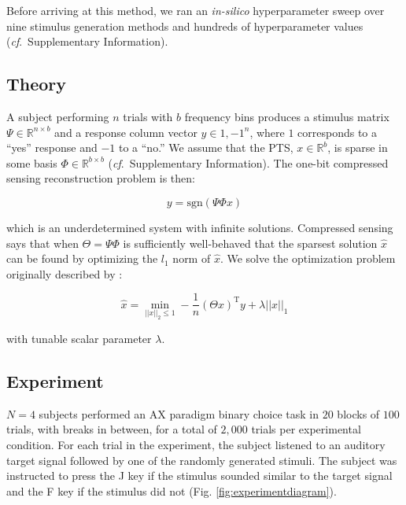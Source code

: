 \documentclass[journal]{IEEEtran}
\newcommand{\cf}{\textit{cf}.\ }
\begin{document}
Before arriving at this method, we ran an \textit{in-silico} hyperparameter sweep over
nine stimulus generation methods and hundreds of hyperparameter values
(\cf Supplementary Information).

\subsection{Theory}

A subject performing $n$ trials with $b$ frequency bins produces
a stimulus matrix $\Psi \in \mathbb{R}^{n \times b}$
and a response column vector $y \in {1,-1}^n$,
where $1$ corresponds to a ``yes'' response and $-1$ to a ``no.''
We assume that the PTS, $x \in \mathbb{R}^b$, is sparse in some basis $\Phi \in \mathbb{R}^{b \times b}$
(\cf Supplementary Information).
The one-bit compressed sensing reconstruction problem is then:

\begin{equation}
	y = \mathrm{sgn}(\Psi \Phi x)
\end{equation}

which is an underdetermined system with infinite solutions.
Compressed sensing says that when $\Theta = \Psi \Phi$
is sufficiently well-behaved \cite{candesIntroductionCompressiveSampling2008}
that the sparsest solution $\hat{x}$ can be found by optimizing the $l_1$ norm of $\hat{x}$.
We solve the optimization problem originally described by \cite{zhangEfficientAlgorithmsRobust2014}:

\begin{equation}
	\hat{x} = \min_{||x||_2 \leq 1} - \frac{1}{n} (\Theta x)^{\mathrm{T}} y + \lambda ||x||_1
\end{equation}

with tunable scalar parameter $\lambda$.

\subsection{Experiment}

$N=4$ subjects performed an AX paradigm binary choice task
in $20$ blocks of $100$ trials, with breaks in between,
for a total of $2,000$ trials per experimental condition.
For each trial in the experiment,
the subject listened to an auditory target signal
followed by one of the randomly generated stimuli.
The subject was instructed to press the J key if the stimulus sounded similar to the target signal
and the F key if the stimulus did not (Fig. \ref{fig:experimentdiagram}).
\end{document}
